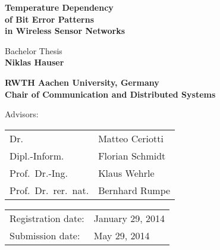 \titlehead{
	\centering
	\texttt{[image: thesis-tex/logos/comsys-text]}
	\hfill
	\texttt{[image: thesis-tex/logos/rwth]}
} %

\begin{titlepage}

\let\footnotesize\small \let\footnoterule\relax

\hbox{}
\vfill

\centering

\begin{doublespace} 
{ \huge\textbf{\textsf{Temperature Dependency \\ \vspace{-0.4em}
of Bit Error Patterns \\ \vspace{-0.4em}
in Wireless Sensor Networks \\ \vspace{-0.4em}}}}
\end{doublespace}
\vskip 2cm

{\large Bachelor Thesis\\[5pt]}
{\large \textbf{Niklas Hauser}}
\vskip 1cm

\textbf{RWTH Aachen University, Germany\\[5pt]
        Chair of Communication and Distributed Systems}
\vskip 2cm

\large

Advisors:
\vskip 2mm

\begin{tabular}{R{7cm}p{7cm}}
Dr. & Matteo Ceriotti\\
Dipl.-Inform. & Florian Schmidt\\
Prof.~Dr.-Ing. & Klaus Wehrle\\
Prof.~Dr.~rer.~nat. & Bernhard Rumpe
\end{tabular}
\vskip 1cm

\begin{tabular}{R{6cm}p{6cm}}
Registration date:  & January 29, 2014 \\
Submission date:    & May 29, 2014 \\
\end{tabular}

\vfill

\end{titlepage}

